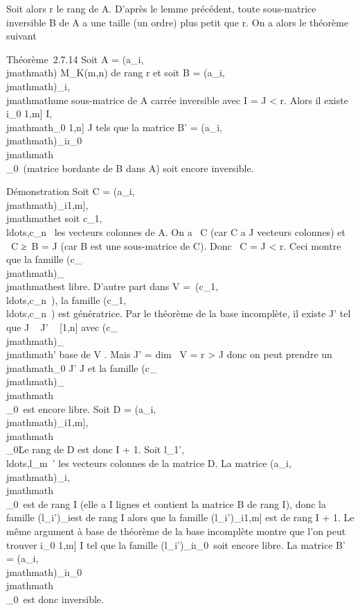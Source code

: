 \documentclass[]{article}
\begin{document}
Soit alors r le rang de A. D'après le lemme précédent, toute
sous-matrice inversible B de A a une taille (un ordre) plus petit que r.
On a alors le théorème suivant

Théorème~2.7.14 Soit A = (a_i,\\jmathmath) \in M_K(m,n) de rang r
et soit B = (a_i,\\jmathmath)_i\inI,\\jmathmath\inJ une sous-matrice de A
carrée inversible avec I = J
\textless{} r. Alors il existe i_0 \in {[}1,m{]} \diagdown I,\\jmathmath_0
\in {[}1,n{]} \diagdown J tels que la matrice B' =
(a_i,\\jmathmath)_i\inI\cup\i_0\,\\jmathmath\inJ\cup\\\jmathmath_0\
(matrice bordante de B dans A) soit encore inversible.

Démonstration Soit C = (a_i,\\jmathmath)_i\in{[}1,m{]},\\jmathmath\inJ et soit
c_1,\\ldots,c_n~
les vecteurs colonnes de A. On a
\mathrmrg~C
\leqJ (car C a J vecteurs colonnes)
et \mathrmrg~C
≥\mathrmrg~B =
J (car B est une sous-matrice de C). Donc
\mathrmrg~C =
J \textless{} r. Ceci montre que la famille
(c_\\jmathmath)_\\jmathmath\inJ est libre. D'autre part dans V
=\
\mathrmVect(c_1,\\ldots,c_n~),
la famille
(c_1,\\ldots,c_n~)
est génératrice. Par le théorème de la base incomplète, il existe J' tel
que J \subset~ J' \subset~ {[}1,n{]} avec (c_\\jmathmath)_\\jmathmath\inJ' base de V .
Mais J' = dim~ V = r
\textgreater{} J donc on peut prendre un
\\jmathmath_0 ' \diagdown J et la famille
(c_\\jmathmath)_\\jmathmath\inJ\cup\\\jmathmath_0\
est encore libre. Soit D =
(a_i,\\jmathmath)_i\in{[}1,m{]},\\jmathmath\inJ\cup\\\jmathmath_0\.
Le rang de D est donc I + 1. Soit
l_1',\\ldots,l_m~'
les vecteurs colonnes de la matrice D. La matrice
(a_i,\\jmathmath)_i\inI,\\jmathmath\inJ\cup\\\jmathmath_0\
est de rang I (elle a I lignes
et contient la matrice B de rang I), donc la famille
(l_i')_i\inI est de rang I alors que
la famille (l_i')_i\in{[}1,m{]} est de rang
I + 1. Le même argument à base de théorème de la
base incomplète montre que l'on peut trouver i_0 \in {[}1,m{]} \diagdown
I tel que la famille
(l_i')_i\inI\cup\i_0\
soit encore libre. La matrice B' =
(a_i,\\jmathmath)_i\inI\cup\i_0\,\\jmathmath\inJ\cup\\\jmathmath_0\
est donc inversible.
\end{document}
